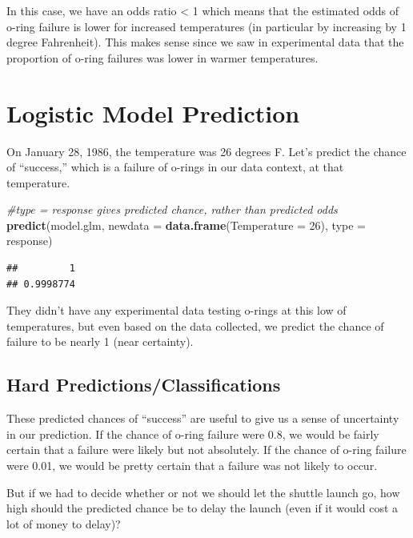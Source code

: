 \documentclass[
]{book}
\newenvironment{Shaded}{\begin{snugshade}}{\end{snugshade}}
\newcommand{\AttributeTok}[1]{\textcolor[rgb]{0.13,0.29,0.53}{#1}}
\newcommand{\CommentTok}[1]{\textcolor[rgb]{0.56,0.35,0.01}{\textit{#1}}}
\newcommand{\DecValTok}[1]{\textcolor[rgb]{0.00,0.00,0.81}{#1}}
\newcommand{\FunctionTok}[1]{\textcolor[rgb]{0.13,0.29,0.53}{\textbf{#1}}}
\newcommand{\NormalTok}[1]{#1}
\newcommand{\StringTok}[1]{\textcolor[rgb]{0.31,0.60,0.02}{#1}}
\begin{document}
In this case, we have an odds ratio \textless{} 1 which means that the estimated odds of o-ring failure is lower for increased temperatures (in particular by increasing by 1 degree Fahrenheit). This makes sense since we saw in experimental data that the proportion of o-ring failures was lower in warmer temperatures.

\section{Logistic Model Prediction}\label{logistic-model-prediction}

On January 28, 1986, the temperature was 26 degrees F. Let's predict the chance of ``success,'' which is a failure of o-rings in our data context, at that temperature.

\begin{Shaded}
\begin{Highlighting}[]
\CommentTok{\#type = \textquotesingle{}response\textquotesingle{} gives predicted chance, rather than predicted odds}
\FunctionTok{predict}\NormalTok{(model.glm, }\AttributeTok{newdata =} \FunctionTok{data.frame}\NormalTok{(}\AttributeTok{Temperature =} \DecValTok{26}\NormalTok{), }\AttributeTok{type =} \StringTok{\textquotesingle{}response\textquotesingle{}}\NormalTok{) }
\end{Highlighting}
\end{Shaded}

\begin{verbatim}
##         1 
## 0.9998774
\end{verbatim}

They didn't have any experimental data testing o-rings at this low of temperatures, but even based on the data collected, we predict the chance of failure to be nearly 1 (near certainty).

\subsection{Hard Predictions/Classifications}\label{hard-predictionsclassifications}

These predicted chances of ``success'' are useful to give us a sense of uncertainty in our prediction. If the chance of o-ring failure were 0.8, we would be fairly certain that a failure were likely but not absolutely. If the chance of o-ring failure were 0.01, we would be pretty certain that a failure was not likely to occur.

But if we had to decide whether or not we should let the shuttle launch go, how high should the predicted chance be to delay the launch (even if it would cost a lot of money to delay)?
\end{document}
